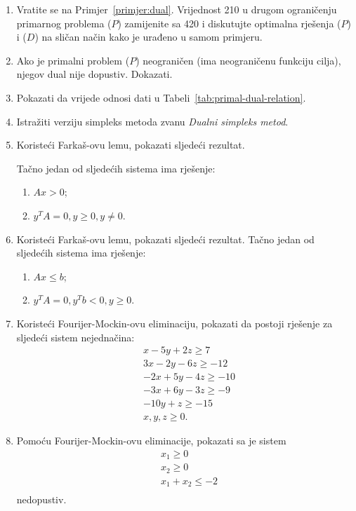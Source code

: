 \documentclass[a4paper, utf8, 11pt, colorlinks]{book}
\theoremstyle{definition}
\begin{document}
\begin{enumerate}
\item Vratite se na Primjer~\ref{primjer:dual}. Vrijednost 210 u drugom ograničenju primarnog problema  ($P$)  zamijenite sa 420 i diskutujte optimalna rješenja  ($P$)  i  ($D$)  na sličan način kako je urađeno  u samom primjeru.

\item Ako je primalni problem ($P$) neograničen (ima neograničenu funkciju cilja), njegov dual nije dopustiv. Dokazati.
\item Pokazati da vrijede odnosi dati u Tabeli~\ref{tab:primal-dual-relation}.
\item Istražiti verziju simpleks metoda zvanu \emph{Dualni simpleks metod}.
\item Koristeći Farkaš-ovu lemu, pokazati sljedeći rezultat. 
 
	Tačno jedan od sljedećih sistema ima rješenje:%
	\begin{enumerate}
		\item $Ax > 0$; 
		\item $y^T A = 0, y \geq 0, y \neq 0.$
	\end{enumerate}
 \item Koristeći Farkaš-ovu lemu, pokazati sljedeći rezultat. 	Tačno jedan od sljedećih sistema ima rješenje:%
 \begin{enumerate}
 	\item $Ax \leq b$; 
 	\item $y^T A = 0, y^T b < 0, y \geq 0.$
 \end{enumerate}
 \item  %
 Koristeći Fourijer-Mockin-ovu eliminaciju, pokazati da postoji rješenje za sljedeći sistem nejednačina:
 \begin{align*} 
 	&x - 5y + 2 z \geq 7 \\
 	&3x - 2y - 6 z \geq -12 \\
 	& -2x + 5y - 4z \geq -10 \\
 	& -3x + 6y - 3z \geq -9 \\
 	& -10 y + z \geq -15 \\  
 	& x,y,z \geq 0.
 \end{align*}
\item Pomoću Fourijer-Mockin-ovu eliminacije, pokazati sa je sistem 
\begin{align*}
	&x_1 \geq 0 \\
	&x_2 \geq 0 \\
	& x_1 + x_2 \leq -2 \\
\end{align*}
nedopustiv.%


\end{enumerate}
\end{document}
